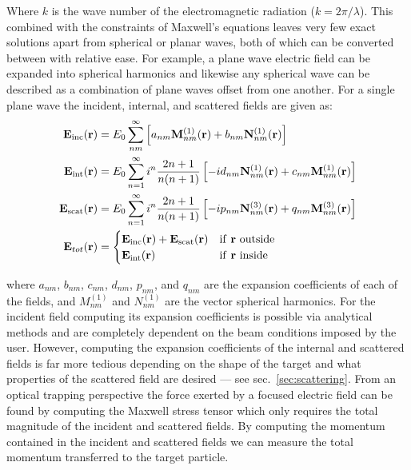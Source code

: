 Where $k$ is the wave number of the electromagnetic radiation 
($k = 2\pi/\lambda$). This combined with the constraints of 
Maxwell's equations leaves very few exact solutions apart from 
spherical or planar waves, both of which can be converted between 
with relative ease. For example, a plane wave electric field can 
be expanded into spherical harmonics and likewise any spherical 
wave can be described as a combination of plane waves offset from 
one another. For a single plane wave the incident, internal, and 
scattered fields are given as: 
\begin{align}
	\label{eq:incident}
	{\bf E}_{\rm inc}({\bf r})
	&=
    E_0 \sum_{nm}^\infty \left[
    a_{nm}{\bf M}_{nm}^{(1)}({\bf r})
    + b_{nm}{\bf N}_{nm}^{(1)}({\bf r})\right]
  \\
  \label{eq:internal}
  {\bf E}_{\rm int}({\bf r})
  &=
    E_0 \sum_{n=1}^\infty i^n\frac{2n+1}{n(n+1)}\left[
    -id_{nm}{\bf N}_{nm}^{(1)}({\bf r}) + c_{nm}{\bf M}_{nm}^{(1)}({\bf r})
    \right]
  \\
  \label{eq:scattered}
  {\bf E}_{\rm scat}({\bf r})
  &=
    E_0 \sum_{n=1}^\infty  i^n\frac{2n+1}{n(n+1)}\left[
      -i p_{nm}{\bf N}_{nm}^{(3)}({\bf r})+q_{nm}{\bf M}_{nm}^{(3)}({\bf r})
    \right] 
    \\
	\mathbf{E}_{tot}({\bf r}) &= 
	\begin{cases}
		{\bf E}_{\rm inc}({\bf r}) + {\bf E}_{\rm scat}({\bf r}) & \text{if \textbf{r} outside}
		\\ 
		{\bf E}_{\rm int}({\bf r}) & \text{if \textbf{r} inside}
	\end{cases}
\end{align}

where $a_{nm}$, $b_{nm}$, $c_{nm}$, $d_{nm}$, $p_{nm}$, and $q_{nm}$
are the expansion coefficients of each of the fields, and $M^{(1)}_{nm}$ 
and $N^{(1)}_{nm}$ are the vector spherical harmonics. For the incident
field computing its expansion coefficients is possible via analytical
methods and are completely dependent on the beam conditions imposed by
the user. However, computing the expansion coefficients of the
internal and scattered fields is far more tedious depending on the
shape of the target and what properties of the scattered field are
desired --- see sec.~\ref{sec:scattering}.  From an optical
trapping perspective the force exerted by a focused electric field can
be found by computing the Maxwell stress tensor which only requires
the total magnitude of the incident and scattered fields. By computing 
the momentum contained in the incident and scattered fields we can measure
the total momentum transferred to the target particle. 

